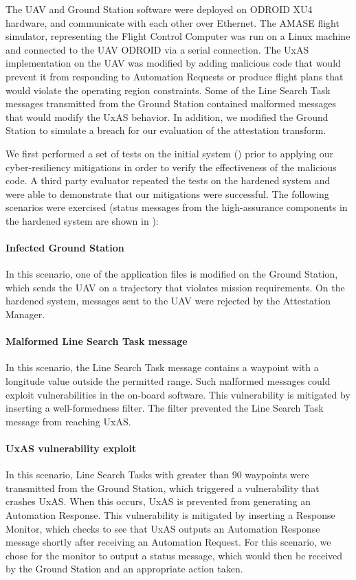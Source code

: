 The UAV and Ground Station software were deployed on ODROID XU4 hardware, and communicate with each other over Ethernet.  The AMASE flight simulator, representing the Flight Control Computer was run on a Linux machine and connected to the UAV ODROID via a serial connection.  The UxAS implementation on the UAV was modified by adding malicious code that would prevent it from responding to Automation Requests or produce flight plans that would violate the operating region constraints.  Some of the Line Search Task messages transmitted from the Ground Station contained malformed messages that would modify the UxAS behavior. In addition, we modified the Ground Station to simulate a breach for our evaluation of the attestation transform.

We first performed a set of tests on the initial system () prior to applying our cyber-resiliency mitigations in order to verify the effectiveness of the malicious code.  
A third party evaluator repeated the tests on the hardened system and were able to demonstrate that our mitigations were successful.
The following scenarios were exercised (status messages from the high-assurance components in the hardened system are shown in ):

\paragraph{Infected Ground Station} In this scenario, one of the application files is modified on the Ground Station, which sends the UAV on a trajectory that violates mission requirements. 
On the hardened system, messages sent to the UAV were rejected by the Attestation Manager.  

\paragraph{Malformed Line Search Task message} In this scenario, the Line Search Task message contains a waypoint with a longitude value outside the permitted range.  Such malformed messages could exploit vulnerabilities in the on-board software.  
This vulnerability is mitigated by inserting a well-formedness filter.  The filter prevented the Line Search Task message from reaching UxAS.

\paragraph{UxAS vulnerability exploit} In this scenario, Line Search Tasks with greater than 90 waypoints were transmitted from the Ground Station, which triggered a vulnerability that crashes UxAS.   When this occurs, UxAS is prevented from generating an Automation Response.  
This vulnerability is mitigated by inserting a Response Monitor, which checks to see that UxAS outputs an Automation Response message shortly after receiving an Automation Request.  For this scenario, we chose for the monitor to output a status message, which would then be received by the Ground Station and an appropriate action taken.

